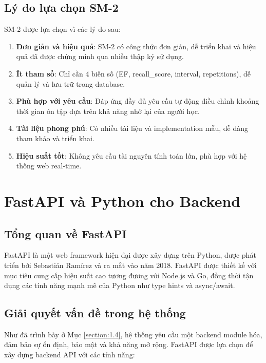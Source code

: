 \documentclass[../DoAn.tex]{subfiles}
\begin{document}
\subsection{Lý do lựa chọn SM-2}

SM-2 được lựa chọn vì các lý do sau:

\begin{enumerate}
    \item \textbf{Đơn giản và hiệu quả}: SM-2 có công thức đơn giản, dễ triển khai và hiệu quả đã được chứng minh qua nhiều thập kỷ sử dụng.
    
    \item \textbf{Ít tham số}: Chỉ cần 4 biến số (EF, recall\_score, interval, repetitions), dễ quản lý và lưu trữ trong database.
    
    \item \textbf{Phù hợp với yêu cầu}: Đáp ứng đầy đủ yêu cầu tự động điều chỉnh khoảng thời gian ôn tập dựa trên khả năng nhớ lại của người học.
    
    \item \textbf{Tài liệu phong phú}: Có nhiều tài liệu và implementation mẫu, dễ dàng tham khảo và triển khai.
    
    \item \textbf{Hiệu suất tốt}: Không yêu cầu tài nguyên tính toán lớn, phù hợp với hệ thống web real-time.
\end{enumerate}

\section{FastAPI và Python cho Backend}
\label{section:3.2}

\subsection{Tổng quan về FastAPI}

FastAPI là một web framework hiện đại được xây dựng trên Python, được phát triển bởi Sebastián Ramírez và ra mắt vào năm 2018. FastAPI được thiết kế với mục tiêu cung cấp hiệu suất cao tương đương với Node.js và Go, đồng thời tận dụng các tính năng mạnh mẽ của Python như type hints và async/await.

\subsection{Giải quyết vấn đề trong hệ thống}

Như đã trình bày ở Mục \ref{section:1.4}, hệ thống yêu cầu một backend module hóa, đảm bảo sự ổn định, bảo mật và khả năng mở rộng. FastAPI được lựa chọn để xây dựng backend API với các tính năng:
\end{document}
